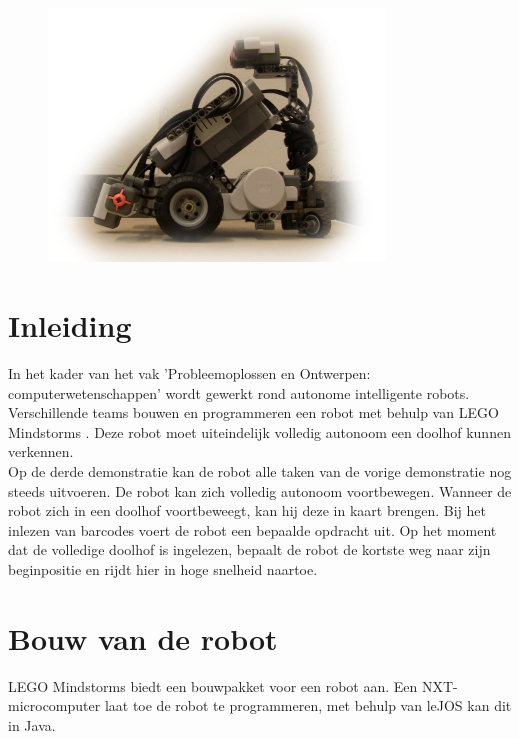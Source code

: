 \documentclass[tt3]{penoverslag}
\begin{document}
\begin{figure}[!hb]
\begin{flushright}
    \includegraphics[width=0.8\textwidth]{robotFP}
    \label{fig:robotFP}
\end{flushright}
\end{figure}

\newpage

\tableofcontents
\listoftables
\listoffigures
\thispagestyle{empty}

\newpage 

\section{Inleiding} %
\label{ssec:inl}
In het kader van het vak 'Probleemoplossen en Ontwerpen: computerwetenschappen' wordt gewerkt rond autonome intelligente robots. Verschillende teams bouwen en programmeren een robot met behulp van LEGO Mindstorms \cite{mindstorms}. Deze robot moet uiteindelijk volledig autonoom een doolhof kunnen verkennen.\\

Op de derde demonstratie kan de robot alle taken van de vorige demonstratie nog steeds uitvoeren. De robot kan zich volledig autonoom voortbewegen. Wanneer de robot zich in een doolhof voortbeweegt, kan hij deze in kaart brengen. Bij het inlezen van barcodes voert de robot een bepaalde opdracht uit. Op het moment dat de volledige doolhof is ingelezen, bepaalt de robot de kortste weg naar zijn beginpositie en rijdt hier in hoge snelheid naartoe.

\section{Bouw van de robot} %
\label{sec:bouw}
LEGO Mindstorms biedt een bouwpakket voor een robot aan. Een NXT-microcomputer laat toe de robot te programmeren, met behulp van leJOS \cite{leJOS} kan dit in Java.
\end{document}
